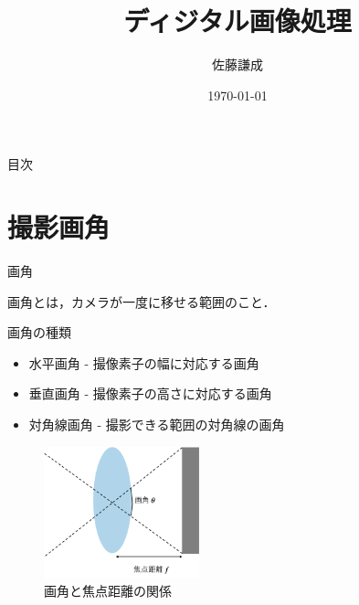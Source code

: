 \documentclass[8pt, jfont=ipaexm, t]{beamer} %
\title{ディジタル画像処理}
\institute{画像情報工学研究室}
\author{佐藤謙成}
\date{\today}
\begin{document}
\maketitle

\begin{frame}{目次}
    \tableofcontents
\end{frame}

\section{撮影画角}
\begin{frame}{画角}
  \begin{block}{}
    画角とは，カメラが一度に移せる範囲のこと．
  \end{block}
  \begin{block}{画角の種類}
    \begin{itemize}
      \item 水平画角 - 撮像素子の幅に対応する画角
      \item 垂直画角 - 撮像素子の高さに対応する画角
      \item 対角線画角 - 撮影できる範囲の対角線の画角
    \end{itemize}
  \end{block}
  \begin{figure}[H]
      \centering
      \includegraphics[width=0.4\textwidth]{figure/01.png}
      \caption{画角と焦点距離の関係}
      \label{fig:01}
  \end{figure}
\end{frame}
\end{document}
